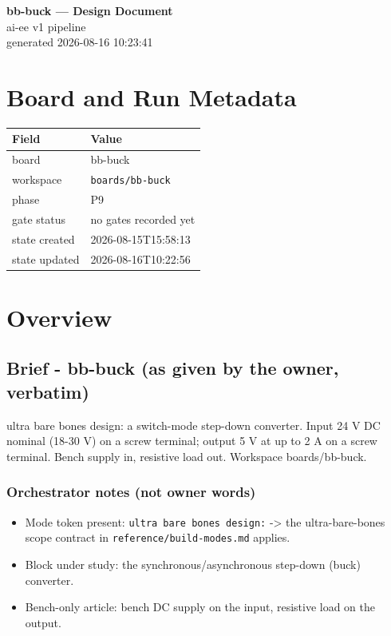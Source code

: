 \documentclass[11pt,a4paper]{article}
\begin{document}
\sloppy
\begin{center}
{\LARGE\bfseries bb-buck --- Design Document}\\[6pt]
{\large ai-ee v1 pipeline}\\[2pt]
generated 2026-08-16 10:23:41
\end{center}
\tableofcontents

\section{Board and Run Metadata}
{\small
\begin{longtable}{lp{11cm}}
\toprule
\textbf{Field} & \textbf{Value} \\
\midrule
\endhead
board & bb-buck \\
workspace & \texttt{boards/bb-buck} \\
phase & P9 \\
gate status & no gates recorded yet \\
state created & 2026-08-15T15:58:13 \\
state updated & 2026-08-16T10:22:56 \\
\bottomrule
\end{longtable}
}
\section{Overview}
\subsection*{Brief - bb-buck (as given by the owner, verbatim)}
ultra bare bones design: a switch-mode step-down converter. Input 24 V DC nominal (18-30 V) on a screw terminal; output 5 V at up to 2 A on a screw terminal. Bench supply in, resistive load out. Workspace boards/bb-buck.

\subsubsection*{Orchestrator notes (not owner words)}
\begin{itemize}
\item Mode token present: \texttt{ultra bare bones design:} -\textgreater{} the ultra-bare-bones scope
contract in \texttt{reference/build-modes.md} applies.
\item Block under study: the synchronous/asynchronous step-down (buck) converter.
\item Bench-only article: bench DC supply on the input, resistive load on the output.
\end{itemize}
\end{document}
